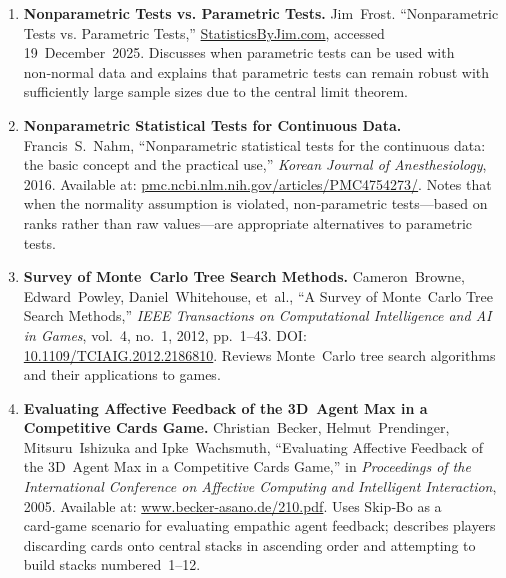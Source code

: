 \documentclass[11pt]{article}
\begin{document}
\begin{enumerate}
\item\label{ref:parametrictests}
\textbf{Nonparametric Tests vs. Parametric Tests.} Jim Frost. “Nonparametric Tests vs. Parametric Tests,” \href{https://statisticsbyjim.com/hypothesis-testing/nonparametric-parametric-tests/}{StatisticsByJim.com}, accessed 19 December 2025. Discusses when parametric tests can be used with non‑normal data and explains that parametric tests can remain robust with sufficiently large sample sizes due to the central limit theorem.

\item\label{ref:nonparametricKorean}
\textbf{Nonparametric Statistical Tests for Continuous Data.} Francis S. Nahm, “Nonparametric statistical tests for the continuous data: the basic concept and the practical use,” \emph{Korean Journal of Anesthesiology}, 2016. Available at: \href{https://pmc.ncbi.nlm.nih.gov/articles/PMC4754273/}{pmc.ncbi.nlm.nih.gov/articles/PMC4754273/}. Notes that when the normality assumption is violated, non‑parametric tests—based on ranks rather than raw values—are appropriate alternatives to parametric tests.

\item\label{ref:mctsSurvey}
\textbf{Survey of Monte Carlo Tree Search Methods.} Cameron Browne, Edward Powley, Daniel Whitehouse, et al., “A Survey of Monte Carlo Tree Search Methods,” \emph{IEEE Transactions on Computational Intelligence and AI in Games}, vol.~4, no.~1, 2012, pp.~1–43. DOI: \href{https://doi.org/10.1109/TCIAIG.2012.2186810}{10.1109/TCIAIG.2012.2186810}. Reviews Monte Carlo tree search algorithms and their applications to games.

\item\label{ref:maxAgent}
\textbf{Evaluating Affective Feedback of the 3D Agent Max in a Competitive Cards Game.} Christian Becker, Helmut Prendinger, Mitsuru Ishizuka and Ipke Wachsmuth, “Evaluating Affective Feedback of the 3D Agent Max in a Competitive Cards Game,” in \emph{Proceedings of the International Conference on Affective Computing and Intelligent Interaction}, 2005. Available at: \href{https://www.becker-asano.de/210.pdf}{www.becker-asano.de/210.pdf}. Uses Skip‑Bo as a card‑game scenario for evaluating empathic agent feedback; describes players discarding cards onto central stacks in ascending order and attempting to build stacks numbered 1–12.
\end{enumerate}
\end{document}
